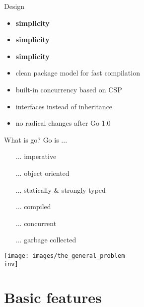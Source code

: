 \documentclass[10pt]{beamer}
\newcommand{\inv}{-inv}
\begin{document}
	
	\begin{frame}{Design}
		\begin{itemize}
			\item \textbf{simplicity}
			\item \textbf{simplicity}
			\item \textbf{simplicity}
			\item clean package model for fast compilation
			\item built-in concurrency based on CSP
			\item interfaces instead of inheritance
			\item no radical changes after Go 1.0
		\end{itemize}
	\end{frame}
	
	
	\begin{frame}{What is go?}
		Go is ...
		\begin{itemize}
			\item[...] imperative
			\item[...] object oriented
			\item[...] statically \& strongly typed
			\item[...] compiled
			\item[...] concurrent
			\item[...] garbage collected
		\end{itemize}
	\end{frame}
	
	
	\begin{frame}
		\begin{center}
			\texttt{[image: images/the\_general\_problem\\inv]}
		\end{center}
	\end{frame}

	
	\section{Basic features}
	
	
\end{document}
